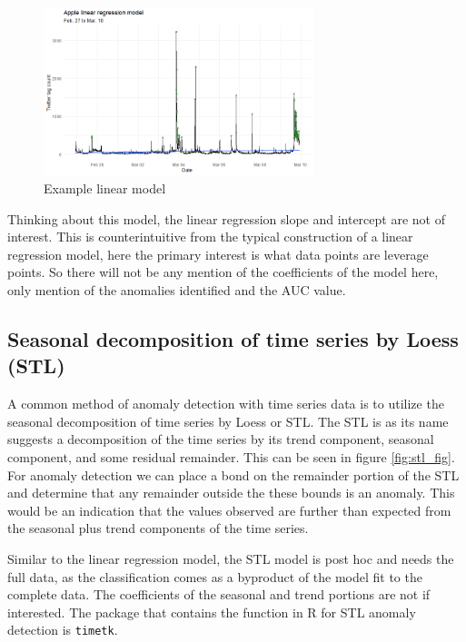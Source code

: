 \documentclass{article}
\begin{document}
\begin{figure}[hb]
    \centering
    \includegraphics[width=0.7\textwidth]{linear_model.png}
    \caption{Example linear model}
    \label{fig:lm_fig}
\end{figure}

Thinking about this model, the linear regression slope and intercept are not of interest. This is counterintuitive from the typical construction of a linear regression model, here the primary interest is what data points are leverage points. So there will not be any mention of the coefficients of the model here, only mention of the anomalies identified and the AUC value.

\subsection{Seasonal decomposition of time series by Loess (STL)}
A common method of anomaly detection with time series data is to utilize the seasonal decomposition of time series by Loess or STL. The STL is as its name suggests a decomposition of the time series by its trend component, seasonal component, and some residual remainder. This can be seen in figure \ref{fig:stl_fig}. For anomaly detection we can place a bond on the remainder portion of the STL and determine that any remainder outside the these bounds is an anomaly. This would be an indication that the values observed are further than expected from the seasonal plus trend components of the time series.

Similar to the linear regression model, the STL model is post hoc and needs the full data, as the classification comes as a byproduct of the model fit to the complete data. The coefficients of the seasonal and trend portions are not if interested. The package that contains the function in R for STL anomaly detection is \texttt{timetk}.
\end{document}
